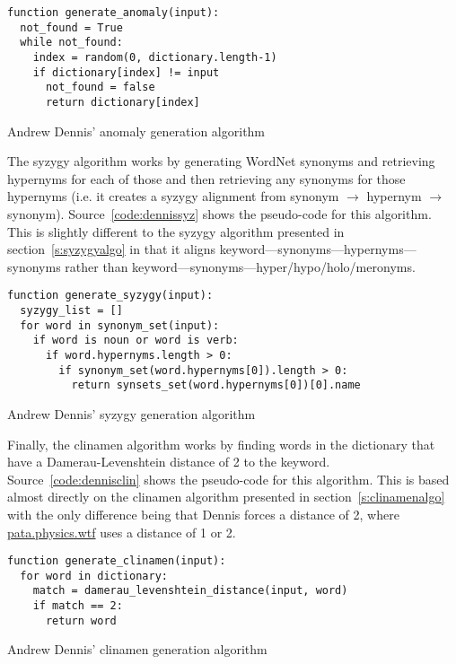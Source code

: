 \begin{listing}[!htbp] %
  \begin{verbatim}
function generate_anomaly(input):
  not_found = True
  while not_found:
    index = random(0, dictionary.length-1)
    if dictionary[index] != input
      not_found = false
      return dictionary[index]
  \end{verbatim}
\caption[Dennis' anomaly generation]{Andrew Dennis' anomaly generation algorithm}
\label{code:dennisano}
\end{listing}

The syzygy algorithm works by generating WordNet synonyms and retrieving hypernyms for each of those and then retrieving any synonyms for those hypernyms (i.e. it creates a syzygy alignment from synonym $\to$ hypernym $\to$ synonym). Source~\ref{code:dennissyz} shows the pseudo-code for this algorithm. This is slightly different to the syzygy algorithm presented in section~\ref{s:syzygyalgo} in that it aligns keyword---synonyms---hypernyms---synonyms rather than keyword---synonyms---hyper/\-hypo/\-holo/\-meronyms.

\begin{listing}[!htbp] %
  \begin{verbatim}
function generate_syzygy(input):
  syzygy_list = []
  for word in synonym_set(input):
    if word is noun or word is verb:
      if word.hypernyms.length > 0:
        if synonym_set(word.hypernyms[0]).length > 0:
          return synsets_set(word.hypernyms[0])[0].name
  \end{verbatim}
\caption[Dennis' syzygy generation]{Andrew Dennis' syzygy generation algorithm}
\label{code:dennissyz}
\end{listing}

Finally, the clinamen algorithm works by finding words in the dictionary that have a Damerau-Levenshtein distance of 2 to the keyword. Source~\ref{code:dennisclin} shows the pseudo-code for this algorithm. This is based almost directly on the clinamen algorithm presented in section~\ref{s:clinamenalgo} with the only difference being that Dennis forces a distance of 2, where \url{pata.physics.wtf} uses a distance of 1 or 2.

\begin{listing}[!htbp] %
  \begin{verbatim}
function generate_clinamen(input):
  for word in dictionary:
    match = damerau_levenshtein_distance(input, word)
    if match == 2:
      return word
  \end{verbatim}
\caption[Dennis' clinamen generation]{Andrew Dennis' clinamen generation algorithm}
\label{code:dennisclin}
\end{listing}


